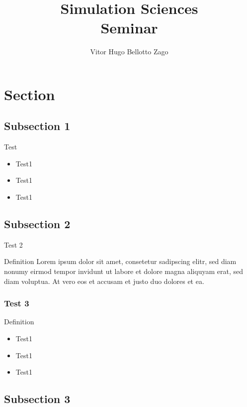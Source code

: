 \documentclass{beamer}
\title{Simulation Sciences \\
Seminar}
\author{Vitor Hugo Bellotto Zago}
\begin{document}
\RWTHtitle

\section{Section}

    \subsection{Subsection 1}

        \begin{frame}{Test}
            \begin{itemize}
                \item Test1
                \pause
                \item Test1
                \pause
                \item Test1
            \end{itemize}
        \end{frame}

    \subsection{Subsection 2}

        \begin{frame}{Test 2}
            \begin{block}{Definition}
                Lorem ipsum dolor sit amet, consetetur sadipscing elitr, sed diam nonumy eirmod tempor invidunt ut labore et dolore magna aliquyam erat, sed diam voluptua. At vero eos et accusam et justo duo dolores et ea.
            \end{block}
        \end{frame}

        \begin{frame}
            \frametitle{Test 3}
            \begin{block}{Definition}
            \begin{itemize}
                \item Test1
                \item Test1
                \item Test1
            \end{itemize}
            \end{block}
        \end{frame}

   \subsection{Subsection 3}
   
\end{document}
